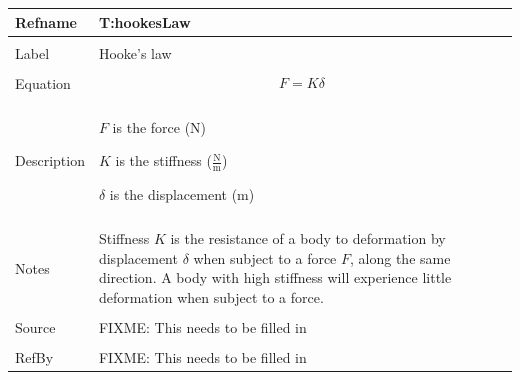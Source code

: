 \documentclass[12pt]{article}
\begin{document}
\noindent \begin{minipage}{\textwidth}
\begin{tabular}{p{} p{}}
\toprule \textbf{Refname} & \textbf{T:hookesLaw}
\label{T:hookesLaw}
\\ \midrule \\
Label & Hooke's law
\\ \midrule \\
Equation & \begin{dmath}
           F=K δ
           \end{dmath}
\\ \midrule \\
Description & \begin{symbDescription}
              \item{$F$ is the force (N)}
              \item{$K$ is the stiffness ($\frac{\text{N}}{\text{m}}$)}
              \item{$δ$ is the displacement (m)}
              \end{symbDescription}
\\ \midrule \\
Notes & Stiffness $K$ is the resistance of a body to deformation by displacement $δ$ when subject to a force $F$, along the same direction. A body with high stiffness will experience little deformation when subject to a force.
\\ \midrule \\
Source & FIXME: This needs to be filled in
\\ \midrule \\
RefBy & FIXME: This needs to be filled in
\\ \bottomrule \end{tabular}
\end{minipage}\\
\end{document}
